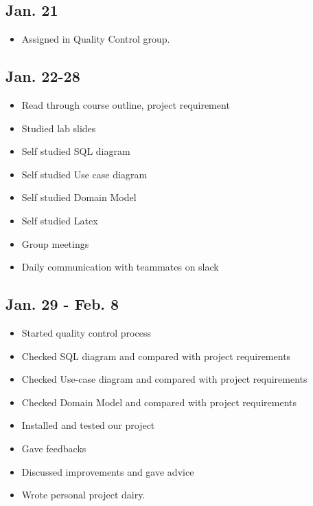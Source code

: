 \documentclass[12pt]{article}
\begin{document}
\maketitle

\subsection*{Jan. 21 }
\begin{itemize}
\item Assigned in Quality Control group.
\end{itemize}
\subsection*{Jan. 22-28 }
\begin{itemize}
\item Read through course outline, project requirement
\item Studied lab slides 
\item Self studied SQL diagram 
\item Self studied Use case diagram
\item Self studied Domain Model
\item Self studied Latex
\item Group meetings
\item Daily communication with teammates on slack
\end{itemize}



\subsection*{Jan. 29 - Feb. 8}

\begin{itemize}
     \item Started quality control process 
     \item Checked SQL diagram and compared with project requirements 
     \item Checked Use-case diagram and compared with project requirements 
     \item Checked Domain Model and compared with project requirements 
     \item Installed and tested our project
     \item Gave feedbacks 
     \item Discussed improvements and gave advice 
     \item Wrote personal project dairy. 
\end{itemize}
\end{document}
